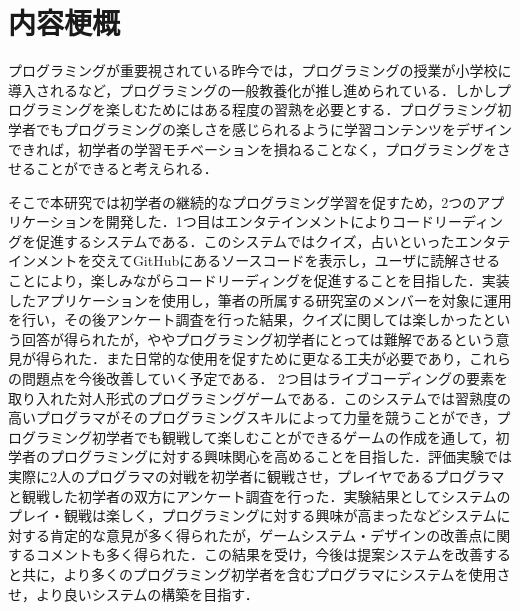 \section*{内容梗概}

プログラミングが重要視されている昨今では，プログラミングの授業が小学校に導入されるなど，プログラミングの一般教養化が推し進められている．しかしプログラミングを楽しむためにはある程度の習熟を必要とする．プログラミング初学者でもプログラミングの楽しさを感じられるように学習コンテンツをデザインできれば，初学者の学習モチベーションを損ねることなく，プログラミングをさせることができると考えられる．

そこで本研究では初学者の継続的なプログラミング学習を促すため，2つのアプリケーションを開発した．1つ目はエンタテインメントによりコードリーディングを促進するシステムである．このシステムではクイズ，占いといったエンタテインメントを交えてGitHubにあるソースコードを表示し，ユーザに読解させることにより，楽しみながらコードリーディングを促進することを目指した．実装したアプリケーションを使用し，筆者の所属する研究室のメンバーを対象に運用を行い，その後アンケート調査を行った結果，クイズに関しては楽しかったという回答が得られたが，ややプログラミング初学者にとっては難解であるという意見が得られた．また日常的な使用を促すために更なる工夫が必要であり，これらの問題点を今後改善していく予定である．
2つ目はライブコーディングの要素を取り入れた対人形式のプログラミングゲームである．このシステムでは習熟度の高いプログラマがそのプログラミングスキルによって力量を競うことができ，プログラミング初学者でも観戦して楽しむことができるゲームの作成を通して，初学者のプログラミングに対する興味関心を高めることを目指した．評価実験では実際に2人のプログラマの対戦を初学者に観戦させ，プレイヤであるプログラマと観戦した初学者の双方にアンケート調査を行った．実験結果としてシステムのプレイ・観戦は楽しく，プログラミングに対する興味が高まったなどシステムに対する肯定的な意見が多く得られたが，ゲームシステム・デザインの改善点に関するコメントも多く得られた．この結果を受け，今後は提案システムを改善すると共に，より多くのプログラミング初学者を含むプログラマにシステムを使用させ，より良いシステムの構築を目指す．